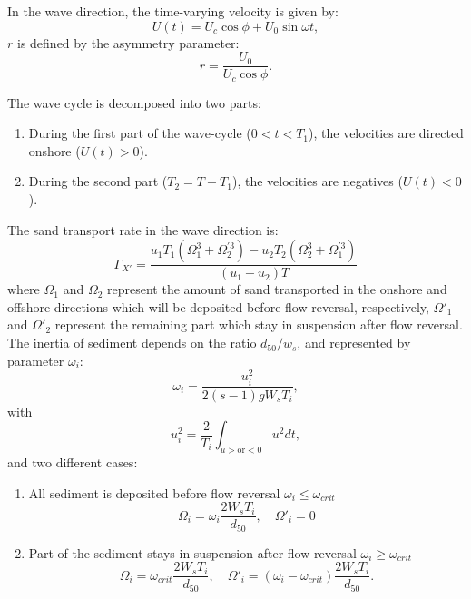 \begin{itemize}
In the wave direction, the time-varying velocity is given by:
\begin{equation*}
U(t)=U_c \cos \phi + U_0 \sin \omega t, 
\end{equation*}
$r$ is defined by the asymmetry parameter:
\begin{equation*}
r=\frac{U_0}{U_c\cos \phi}. 
\end{equation*}

The wave cycle is decomposed into two parts:
\begin{enumerate}
\item During the first part of the wave-cycle ($0 <  t < T_1$), 
the velocities are directed onshore ($U(t) > 0$).
\item During the second part ($T_2 = T-T_1$), the
velocities are negatives ($U(t) <0$).
\end{enumerate}

The sand transport rate in the wave direction is:
\begin{equation*}
\Gamma_{X'} = \frac{u_1T_1(\Omega_1^3+\Omega_2^{'3})-u_2T_2(\Omega_2^3+\Omega_1^{'3})}{(u_1+u_2)T}
\end{equation*}
where $\Omega_1$ and $\Omega_2$ represent the amount of sand
transported in the onshore and offshore directions which will
be deposited before flow reversal, respectively, $\Omega'_1$ and $\Omega'_2$
represent the remaining part which stay in suspension after flow reversal.
The inertia of sediment depends on the ratio $d_{50}/w_s$, and
represented by parameter $\omega_i$:
\begin{equation*}
\omega_i = \frac{u_i^2}{2(s-1)gW_s T_i}, 
\end{equation*}
with 
\begin{equation*}
u_i^2 = \frac{2}{T_i} \int_{u>\text{or}<0} u^2 d t, 
\end{equation*}
and two different cases:
\begin{enumerate}
\item All sediment is deposited before flow reversal $\omega_i\leq \omega_{crit}$
\begin{equation*}
\Omega_i=\omega_i\frac{2W_s T_i}{d_{50}}, \quad \Omega'_i = 0
\end{equation*}

\item Part of the sediment stays in suspension after flow reversal $\omega_i \geq \omega_{crit}$
\begin{equation*}
\Omega_i = \omega_{crit} \frac{2W_s T_i}{d_{50}}, \quad \Omega'_i=(\omega_i-\omega_{crit})\frac{2W_sT_i}{d_{50}}.
\end{equation*}


\end{enumerate}
\end{itemize}
